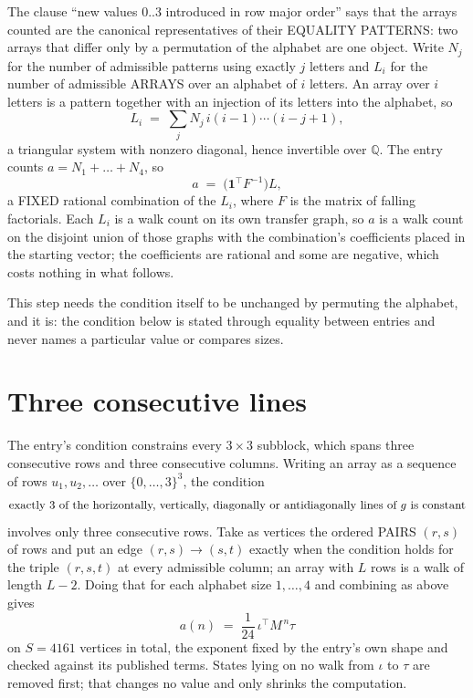 \documentclass[11pt,a4paper]{article}
\theoremstyle{plain}
\theoremstyle{definition}
\begin{document}
The clause ``new values $0..3$ introduced in row major order'' says that the arrays
counted are the canonical representatives of their EQUALITY PATTERNS: two arrays that differ
only by a permutation of the alphabet are one object. Write $N_j$ for the number of admissible
patterns using exactly $j$ letters and $L_i$ for the number of admissible ARRAYS over an
alphabet of $i$ letters. An array over $i$ letters is a pattern together with an injection of
its letters into the alphabet, so
\[
L_i\;=\;\sum_{j}N_j\,i(i-1)\cdots(i-j+1),
\]
a triangular system with nonzero diagonal, hence invertible over $\mathbb{Q}$. The entry
counts $a=N_1+\dots+N_{4}$, so
\[
a\;=\;\bigl(\mathbf{1}^{\!\top}F^{-1}\bigr)L ,
\]
a FIXED rational combination of the $L_i$, where $F$ is the matrix of falling factorials.
Each $L_i$ is a walk count on its own transfer graph, so $a$ is a walk count on the disjoint
union of those graphs with the combination's coefficients placed in the starting vector; the
coefficients are rational and some are negative, which costs nothing in what follows.

This step needs the condition itself to be unchanged by permuting the alphabet, and it is:
the condition below is stated through equality between entries and never names a particular
value or compares sizes.

\section{Three consecutive lines}

The entry's condition constrains every $3\times3$ subblock, which spans three consecutive
rows and three consecutive columns. Writing an array as a sequence of rows
$u_1,u_2,\dots$ over $\{0,\dots,3\}^{3}$, the condition
\[
\text{exactly }3\text{ of the horizontally, vertically, diagonally or antidiagonally lines of }g\text{ \text{is constant}}
\]
involves only three consecutive rows. Take as vertices the ordered PAIRS $(r,s)$ of
rows and put an edge $(r,s)\to(s,t)$ exactly when the condition holds for the triple
$(r,s,t)$ at every admissible column; an array with $L$ rows is a walk of length $L-2$.
Doing that for each alphabet size $1,\dots,4$ and combining as above gives
\[
a(n)\;=\;\frac{1}{24}\,\iota^{\!\top}M^{\,n}\tau
\]
on $S=4161$ vertices in total, the exponent fixed by the entry's own shape and checked against
its published terms. States lying on no walk from $\iota$ to $\tau$ are removed first; that
changes no value and only shrinks the computation.
\end{document}
